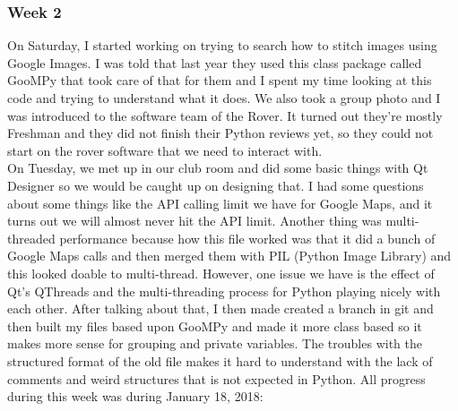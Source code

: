 \subsubsection{Week 2}
On Saturday, I started working on trying to search how to stitch images using Google Images.
I was told that last year they used this class package called GooMPy that took care of that for them and I spent my time looking at this code and trying to understand what it does.
We also took a group photo and I was introduced to the software team of the Rover.
It turned out they're mostly Freshman and they did not finish their Python reviews yet, so they could not start on the rover software that we need to interact with.
\\
On Tuesday, we met up in our club room and did some basic things with Qt Designer so we would be caught up on designing that.
I had some questions about some things like the API calling limit we have for Google Maps, and it turns out we will almost never hit the API limit.
Another thing was multi-threaded performance because how this file worked was that it did a bunch of Google Maps calls and then merged them with PIL (Python Image Library) and this looked doable to multi-thread.
However, one issue we have is the effect of Qt's QThreads and the multi-threading process for Python playing nicely with each other.
After talking about that, I then made created a branch in git and then built my files based upon GooMPy and made it more class based so it makes more sense for grouping and private variables.
The troubles with the structured format of the old file makes it hard to understand with the lack of comments and weird structures that is not expected in Python. 
All progress during this week was during January 18, 2018:\\
